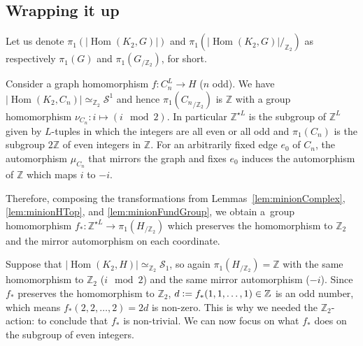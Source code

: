 \documentclass[11pt,a4paper]{scrartcl}
\numberwithin{theorem}{section}
\theoremstyle{definition}
\newcommand{\ZZ}{\mathbb{Z}}
\newcommand{\defeq}{\vcentcolon=}
\newcommand\Sphere{\mathcal{S}}
\DeclareMathOperator{\Hom}{Hom}
\newcommand{\zeq}{\simeq_{\ZZ_2}}
\begin{document}
\subsection*{Wrapping it up}
Let us denote $\pi_1(|\Hom(K_2,G)|)$ and $\pi_1(|\Hom(K_2,G)|/_{\ZZ_2})$ as respectively $\pi_1(G)$ and $\pi_1(G_{/\ZZ_2})$, for short.

Consider a graph homomorphism $f \colon C_n^L \to H$ ($n$ odd).
We have $|\Hom(K_2, C_n)| \simeq_{\ZZ_2} \Sphere^1$
and hence $\pi_1({C_n}_{/\ZZ_2})$ is $\ZZ$
with a group homomorphism $\nu_{C_n}\colon i \mapsto (i\mod 2)$.
In particular $\ZZ^{\star L}$ is the subgroup of $\ZZ^L$ given by $L$-tuples in which the integers are all even or all odd and $\pi_1(C_n)$ is the subgroup $2\ZZ$ of even integers in $\ZZ$.
For an arbitrarily fixed edge $e_0$ of $C_n$, the automorphism $\mu_{C_n}$ that mirrors the graph and fixes $e_0$
induces the automorphism of $\ZZ$ which maps $i$ to $-i$.

Therefore, composing the transformations from Lemmas~\ref{lem:minionComplex}, \ref{lem:minionHTop}, and \ref{lem:minionFundGroup},
we obtain a~group homomorphism $f_* \colon \ZZ^{\star L} \to \pi_1(H_{/\ZZ_2})$ which preserves the homomorphism to $\ZZ_2$ and the mirror automorphism on each coordinate.

Suppose that $|\Hom(K_2,H)|\zeq \Sphere_1$,
so again $\pi_1(H_{/\ZZ_2}) = \ZZ$ with the same homomorphism to $\ZZ_2$ ($i \mod 2$) and the same mirror automorphism ($-i$).
Since $f_*$ preserves the homomorphism to $\ZZ_2$, $d \defeq f_*(1,1,\dots,1) \in \ZZ$ is an odd number,
which means $f_*(2,2,\dots,2)=2d$ is non-zero.
This is why we needed the $\ZZ_2$-action: to conclude that $f_*$ is non-trivial.
We can now focus on what $f_*$ does on the subgroup of even integers.
\end{document}
